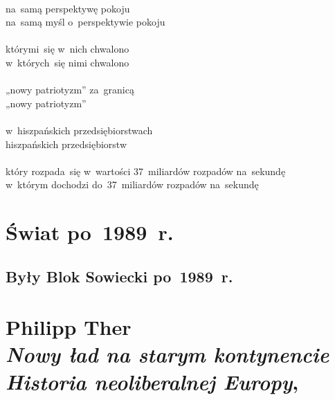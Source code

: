 \documentclass[a4paper,11pt]{article}
\numberwithin{equation}{section}
\begin{document}
\noindent
{} \\
\Jest na~samą perspektywę pokoju \\
\PowinnoByc na~samą myśl o~perspektywie pokoju \\
 \\
\Jest którymi~się w~nich chwalono \\
\PowinnoByc w~których~się nimi chwalono \\
 \\
\Jest „nowy patriotyzm” za~granicą \\
\PowinnoByc „nowy patriotyzm” \\
 \\
\Jest w~hiszpańskich przedsiębiorstwach \\
\PowinnoByc hiszpańskich przedsiębiorstw \\
 \\
\Jest który rozpada~się w~wartości 37~miliardów rozpadów na~sekundę \\
\PowinnoByc w~którym dochodzi do~37~miliardów rozpadów na~sekundę \\













\newpage

\section{Świat po~1989~r.}

\VerSpaceThree



\subsection{Były Blok Sowiecki po~1989~r.}

\VerSpaceThree



\section{Philipp Ther \\
  \textit{Nowy ład na starym kontynencie} \\
  \textit{Historia neoliberalnej Europy}, \cite{TherNowyLad2015}}
\end{document}
